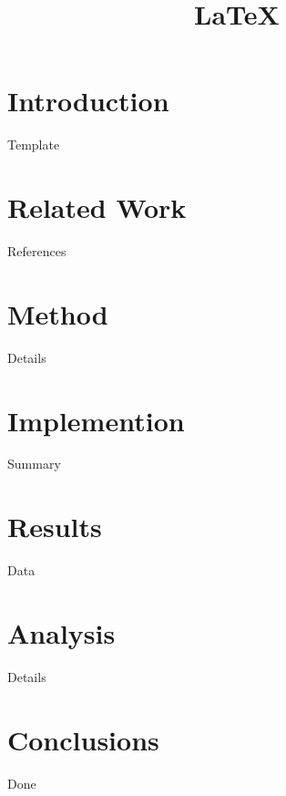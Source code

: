 \documentclass[9pt,twocolumn]{article}
\title{\LaTeX}
\date{}
\begin{document}

\section{Introduction}

  Template

\section{Related Work}

References

\section{Method}

Details

\section{Implemention}

Summary

\section{Results}

Data

\section{Analysis}

Details

\section{Conclusions}

Done
\end{document}
